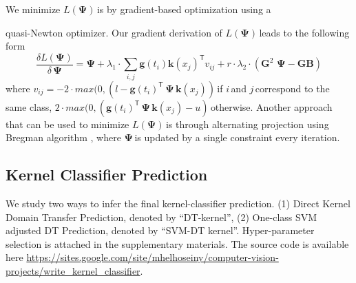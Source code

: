 We minimize \small$L({\mathbf{\Psi}})\,$\normalsize is by gradient-based optimization using a quasi-Newton optimizer. Our  gradient derivation of \small$L({\mathbf{\Psi}})\,$\normalsize leads to the following form
\small
\begin{equation}
\frac{\delta L({\mathbf{\Psi}})}{\delta \, {\mathbf{\Psi}}} =  {\mathbf{\Psi}} + \lambda_1 \cdot  \sum_{i,j} {\mathbf{g}(t_i)}   {\mathbf{k}(x_j)}^\mathsf{T} v_{ij} +
r \cdot \lambda_2 \cdot ( \mathbf{G}^2\,\, {\mathbf{\Psi}} - \mathbf{G} \textbf{B}) 
\label{eq:grd}
\end{equation}
\normalsize
where \small$v_{ij} = - 2 \cdot max(0, (l-\textbf{g}(t_i)^\mathsf{T}\, {\mathbf{\Psi}}\, \textbf{k}(x_j) )\,$\normalsize if \small$i\,$\normalsize and \small$j\,$\normalsize correspond to the same class, \small$2 \cdot max(0, (\textbf{g}(t_i)^\mathsf{T}\, {\mathbf{\Psi}}\, \textbf{k}(x_j) -u )\,$\normalsize otherwise. Another approach that can be used to minimize \small$L({\mathbf{\Psi}})\,$\normalsize is through alternating projection using Bregman algorithm \cite{bregman97}, where \small${\mathbf{\Psi}}\,$\normalsize is updated by a single constraint every iteration.



\subsection{Kernel Classifier Prediction}
We study two ways to infer the final kernel-classifier prediction. (1) Direct Kernel Domain Transfer Prediction, denoted by ``DT-kernel'', (2) One-class SVM adjusted DT Prediction, denoted by ``SVM-DT kernel''. Hyper-parameter selection is attached in the supplementary materials. The source code is available here 
\footnotesize{\url{https://sites.google.com/site/mhelhoseiny/computer-vision-projects/write_kernel_classifier}}.\normalsize  

